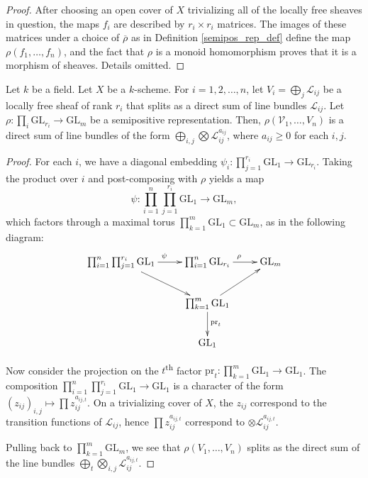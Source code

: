 \begin{proof}
After choosing an open cover of $X$ trivializing all of the locally free
sheaves in question, the maps $f_i$ are described by $r_i \times r_i$ matrices.
The images of these matrices under a choice of $\overline{\rho}$ as in
Definition \ref{semipos_rep_def} define the map $\rho(f_1,\ldots,f_n)$, and the
fact that $\rho$ is a monoid homomorphism proves that it is a morphism of
sheaves.
Details omitted.
\end{proof}

\begin{lemma}\label{rho_of_split_bundle}
Let $k$ be a field.
Let $X$ be a $k$-scheme.
For $i = 1, 2, \ldots, n$, let $V_i = \bigoplus_j \mathcal{L}_{ij}$ be a
locally free sheaf of rank $r_i$ that splits as a direct sum of line bundles
$\mathcal{L}_{ij}$.
Let $\rho : \prod_i \mathrm{GL}_{r_i} \to \mathrm{GL}_m$ be a semipositive
representation.
Then, $\rho(\mathcal{V}_1,\ldots,V_n)$ is a direct sum of line bundles of the
form $\bigoplus_{i,j}\bigotimes\mathcal{L}_{ij}^{a_{ij}}$, where $a_{ij}\ge0$ for
each $i,j$.
\end{lemma}

\begin{proof}
For each $i$, we have a diagonal embedding
$\psi_i : \prod_{j = 1}^{r_i}\mathrm{GL}_1 \to \mathrm{GL}_{r_i}$.
Taking the product over $i$ and post-composing with $\rho$ yields a map
$$
  \psi : \prod_{i = 1}^n \prod_{j = 1}^{r_i} \mathrm{GL}_1 \to \mathrm{GL}_m,
$$
which factors through a maximal torus
$\prod_{k = 1}^m \mathrm{GL}_1 \subset \mathrm{GL}_m$,
as in the following diagram:
$$
\xymatrix{
  \prod_{i = 1}^n \prod_{j = 1}^{r_i} \mathrm{GL}_1 \ar[r]^\psi \ar[rd] &
  \prod_{i = 1}^{n} \mathrm{GL}_{r_i} \ar[r]^\rho &
  \mathrm{GL}_m \\
    &
  \prod_{k = 1}^m \mathrm{GL}_1 \ar[ru] \ar[d]^{\mathrm{pr}_t} \\
    &
  \mathrm{GL}_1
}
$$

Now consider the projection on the $t$\textsuperscript{th} factor
$\mathrm{pr}_t : \prod_{k = 1}^m \mathrm{GL}_1\to \mathrm{GL}_1$.
The composition
$\prod_{i = 1}^n \prod_{j = 1}^{r_i} \mathrm{GL}_1\to \mathrm{GL}_1$ is a
character of the form $(z_{ij})_{i,j}\mapsto \prod z_{ij}^{a_{ij,t}}$.
On a trivializing cover of $X$, the $z_{ij}$ correspond to the transition
functions of $\mathcal{L}_{ij}$, hence $\prod z_{ij}^{a_{ij,t}}$ correspond to
$\otimes\mathcal{L}_{ij}^{a_{ij,t}}$.

Pulling back to $\prod_{k = 1}^m \mathrm{GL}_m$,
we see that $\rho(V_1,\ldots,V_n)$ splits as the direct sum of the line bundles
$\bigoplus_t \bigotimes_{i,j} \mathcal{L}_{ij}^{a_{ij,t}}$.
\end{proof}

